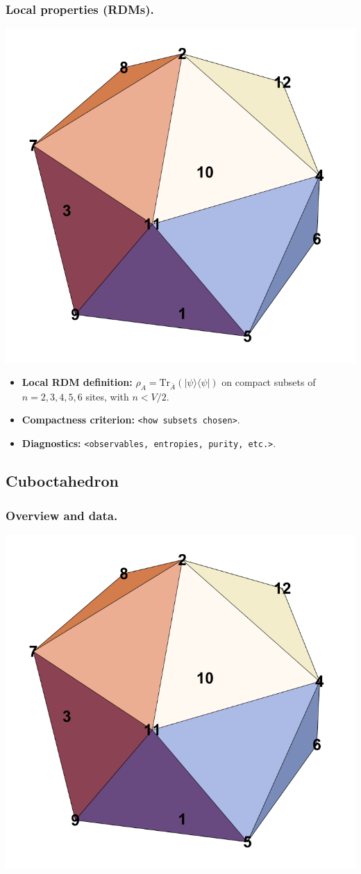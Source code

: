 \documentclass[11pt,a4paper]{article}
\begin{document}
\subsubsection*{Local properties (RDMs).}
\begin{center}
  \includegraphics[width=.6\linewidth]{icosahedron}
\end{center}

\begin{itemize}[leftmargin=1.5em]
  \item \textbf{Local RDM definition:} $\rho_A=\mathrm{Tr}_{\bar A}(|\psi\rangle\langle\psi|)$ on compact subsets of $n=2,3,4,5,6$ sites, with $n < V/2$.
  \item \textbf{Compactness criterion:} \texttt{<how subsets chosen>}.
  \item \textbf{Diagnostics:} \texttt{<observables, entropies, purity, etc.>}.
\end{itemize}


\subsection*{Cuboctahedron}

\subsubsection*{Overview and data.}
\begin{center}
  \includegraphics[width=.6\linewidth]{icosahedron}
\end{center}
\end{document}
